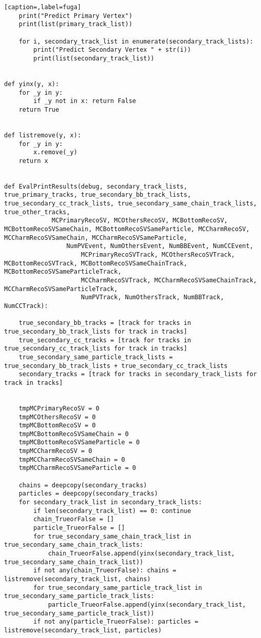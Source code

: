 \begin{lstlisting}[caption=,label=fuga]
    print("Predict Primary Vertex")
    print(list(primary_track_list))

    for i, secondary_track_list in enumerate(secondary_track_lists):
        print("Predict Secondary Vertex " + str(i))
        print(list(secondary_track_list))


def yinx(y, x):
    for _y in y:
        if _y not in x: return False
    return True


def listremove(y, x):
    for _y in y:
        x.remove(_y)
    return x


def EvalPrintResults(debug, secondary_track_lists, true_primary_tracks, true_secondary_bb_track_lists, true_secondary_cc_track_lists, true_secondary_same_chain_track_lists, true_other_tracks,
		     MCPrimaryRecoSV, MCOthersRecoSV, MCBottomRecoSV, MCBottomRecoSVSameChain, MCBottomRecoSVSameParticle, MCCharmRecoSV, MCCharmRecoSVSameChain, MCCharmRecoSVSameParticle,
	             NumPVEvent, NumOthersEvent, NumBBEvent, NumCCEvent,
                     MCPrimaryRecoSVTrack, MCOthersRecoSVTrack, MCBottomRecoSVTrack, MCBottomRecoSVSameChainTrack, MCBottomRecoSVSameParticleTrack,
                     MCCharmRecoSVTrack, MCCharmRecoSVSameChainTrack, MCCharmRecoSVSameParticleTrack,
                     NumPVTrack, NumOthersTrack, NumBBTrack, NumCCTrack):

    true_secondary_bb_tracks = [track for tracks in true_secondary_bb_track_lists for track in tracks]
    true_secondary_cc_tracks = [track for tracks in true_secondary_cc_track_lists for track in tracks]
    true_secondary_same_particle_track_lists = true_secondary_bb_track_lists + true_secondary_cc_track_lists
    secondary_tracks = [track for tracks in secondary_track_lists for track in tracks]


    tmpMCPrimaryRecoSV = 0
    tmpMCOthersRecoSV = 0
    tmpMCBottomRecoSV = 0
    tmpMCBottomRecoSVSameChain = 0
    tmpMCBottomRecoSVSameParticle = 0
    tmpMCCharmRecoSV = 0
    tmpMCCharmRecoSVSameChain = 0
    tmpMCCharmRecoSVSameParticle = 0

    chains = deepcopy(secondary_tracks)
    particles = deepcopy(secondary_tracks)
    for secondary_track_list in secondary_track_lists:
        if len(secondary_track_list) == 0: continue
        chain_TrueorFalse = []
        particle_TrueorFalse = []
        for true_secondary_same_chain_track_list in true_secondary_same_chain_track_lists:
            chain_TrueorFalse.append(yinx(secondary_track_list, true_secondary_same_chain_track_list))
        if not any(chain_TrueorFalse): chains = listremove(secondary_track_list, chains)
        for true_secondary_same_particle_track_list in true_secondary_same_particle_track_lists:
            particle_TrueorFalse.append(yinx(secondary_track_list, true_secondary_same_particle_track_list))
        if not any(particle_TrueorFalse): particles = listremove(secondary_track_list, particles)


\end{lstlisting}
